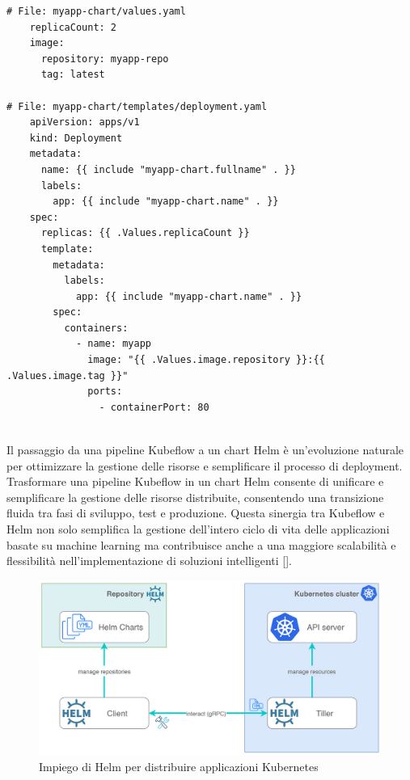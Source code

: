 \begin{code}
\label{code:apx:a:yaml}
\begin{verbatim}
# File: myapp-chart/values.yaml
    replicaCount: 2
    image:
      repository: myapp-repo
      tag: latest
    
# File: myapp-chart/templates/deployment.yaml
    apiVersion: apps/v1
    kind: Deployment
    metadata:
      name: {{ include "myapp-chart.fullname" . }}
      labels:
        app: {{ include "myapp-chart.name" . }}
    spec:
      replicas: {{ .Values.replicaCount }}
      template:
        metadata:
          labels:
            app: {{ include "myapp-chart.name" . }}
        spec:
          containers:
            - name: myapp
              image: "{{ .Values.image.repository }}:{{ .Values.image.tag }}"
              ports:
                - containerPort: 80
    
\end{verbatim}
\end{code}

Il passaggio da una pipeline Kubeflow a un chart Helm è un'evoluzione naturale per ottimizzare la gestione delle risorse e semplificare il processo di deployment. Trasformare una pipeline Kubeflow in un chart Helm consente di unificare e semplificare la gestione delle risorse distribuite, consentendo una transizione fluida tra fasi di sviluppo, test e produzione. Questa sinergia tra Kubeflow e Helm non solo semplifica la gestione dell'intero ciclo di vita delle applicazioni basate su machine learning ma contribuisce anche a una maggiore scalabilità e flessibilità nell'implementazione di soluzioni intelligenti [\cite{kubeflow_helm_integration}].

\begin{figure}[h]
    \centering
    \includegraphics[width=\linewidth]{figures/ch6/helm.png}
    \caption[Impiego di Helm per distribuire applicazioni Kubernetes]{Impiego di Helm per distribuire applicazioni Kubernetes}
    \label{fig:cha6:helm}
\end{figure}

